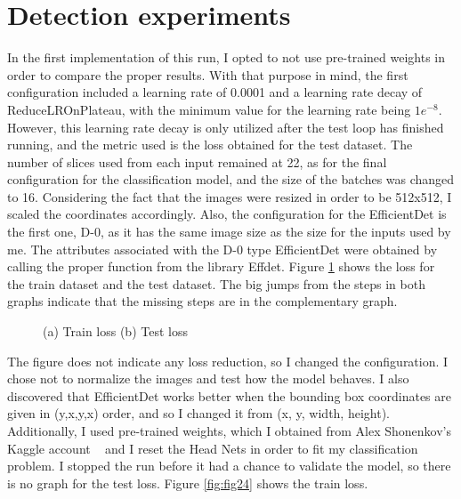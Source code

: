 \section{Detection experiments}
In the first implementation of this run, I opted to not use pre-trained weights in order to compare the proper results. With that purpose in mind, the first configuration included a learning rate of 0.0001 and a learning rate decay of ReduceLROnPlateau, with the minimum value for the learning rate being \(1e^{-8}\). However, this learning rate decay is only utilized after the test loop has finished running, and the metric used is the loss obtained for the test dataset. The number of slices used from each input remained at 22, as for the final configuration for the classification model, and the size of the batches was changed to 16. Considering the fact that the images were resized in order to be 512x512, I scaled the coordinates accordingly. Also, the configuration for the EfficientDet is the first one, D-0, as it has the same image size as the size for the inputs used by me. The attributes associated with the D-0 type EfficientDet were obtained by calling the proper function from the library Effdet. Figure \ref{fig:fig23} shows the loss for the train dataset and the test dataset. The big jumps from the steps in both graphs indicate that the missing steps are in the complementary graph.\\
\begin{figure}[!ht]
    \label{fig:fig23}
    \caption{(a) Train loss (b) Test loss}
\end{figure}
The figure does not indicate any loss reduction, so I changed the configuration. I chose not to normalize the images and test how the model behaves. I also discovered that EfficientDet works better when the bounding box coordinates are given in (y,x,y,x) order, and so I changed it from (x, y, width, height). Additionally, I used pre-trained weights, which I obtained from Alex Shonenkov's Kaggle account ~\cite{link6} and I reset the Head Nets in order to fit my classification problem. I stopped the run before it had a chance to validate the model, so there is no graph for the test loss. Figure \ref{fig:fig24} shows the train loss.\\

